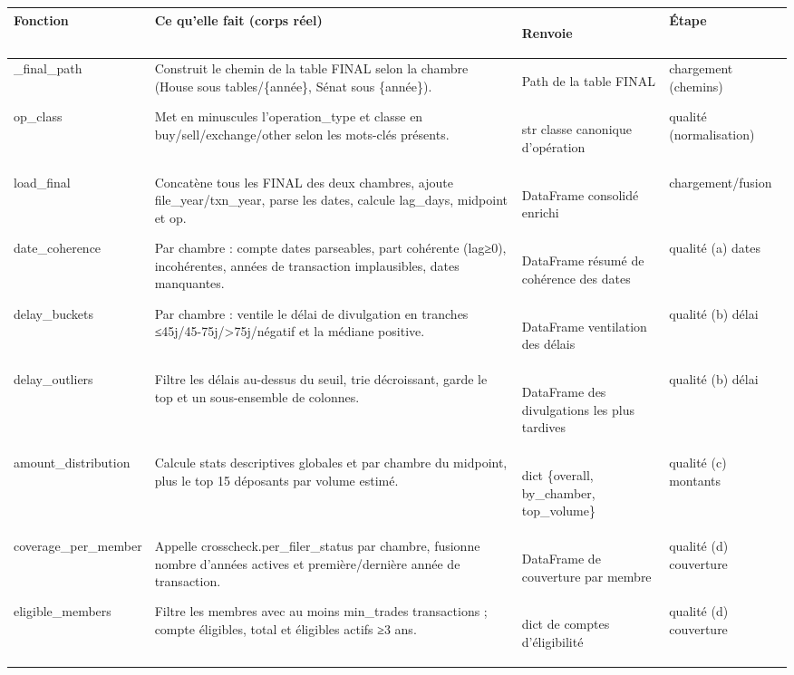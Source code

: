 \documentclass[11pt,a4paper]{article}
\makeatletter
\newenvironment{fnt}{%
  \par\footnotesize
  \setlength{\tabcolsep}{3pt}%
  \begin{longtable}{@{}>{\ttfamily\scriptsize\raggedright\arraybackslash}p{3.0cm} >{\raggedright\arraybackslash}p{7.5cm} >{\itshape\scriptsize\raggedright\arraybackslash}p{2.7cm} >{\scriptsize\raggedright\arraybackslash}p{1.85cm}@{}}
  \toprule
  \normalfont\bfseries\scriptsize Fonction & \bfseries\scriptsize Ce qu'elle fait (corps réel) &
  \normalfont\bfseries\scriptsize Renvoie & \normalfont\bfseries\scriptsize Étape\\
  \midrule\endhead
}{\bottomrule\end{longtable}\par}
\makeatother
\begin{document}
\begin{fnt}
_\allowbreak final_\allowbreak path & Construit le chemin de la table FINAL selon la chambre (House sous tables/\allowbreak{}\{année\},\allowbreak{} Sénat sous \{année\})\allowbreak{}. & Path de la table FINAL & chargement (chemins) \\
op_\allowbreak class & Met en minuscules l'operation_type et classe en buy/\allowbreak{}sell/\allowbreak{}exchange/\allowbreak{}other selon les mots-clés présents. & str classe canonique d'opération & qualité (normalisation) \\
load_\allowbreak final & Concatène tous les FINAL des deux chambres,\allowbreak{} ajoute file_year/\allowbreak{}txn_year,\allowbreak{} parse les dates,\allowbreak{} calcule lag_days,\allowbreak{} midpoint et op. & DataFrame consolidé enrichi & chargement/fusion \\
date_\allowbreak coherence & Par chambre : compte dates parseables,\allowbreak{} part cohérente (lag≥0)\allowbreak{},\allowbreak{} incohérentes,\allowbreak{} années de transaction implausibles,\allowbreak{} dates manquantes. & DataFrame résumé de cohérence des dates & qualité (a) dates \\
delay_\allowbreak buckets & Par chambre : ventile le délai de divulgation en tranches ≤45j/\allowbreak{}45-75j/\allowbreak{}>75j/\allowbreak{}négatif et la médiane positive. & DataFrame ventilation des délais & qualité (b) délai \\
delay_\allowbreak outliers & Filtre les délais au-dessus du seuil,\allowbreak{} trie décroissant,\allowbreak{} garde le top et un sous-ensemble de colonnes. & DataFrame des divulgations les plus tardives & qualité (b) délai \\
amount_\allowbreak distribution & Calcule stats descriptives globales et par chambre du midpoint,\allowbreak{} plus le top 15 déposants par volume estimé. & dict \{overall,\allowbreak{} by_chamber,\allowbreak{} top_volume\} & qualité (c) montants \\
coverage_\allowbreak per_\allowbreak member & Appelle crosscheck.per_filer_status par chambre,\allowbreak{} fusionne nombre d'années actives et première/\allowbreak{}dernière année de transaction. & DataFrame de couverture par membre & qualité (d) couverture \\
eligible_\allowbreak members & Filtre les membres avec au moins min_trades transactions ; compte éligibles,\allowbreak{} total et éligibles actifs ≥3 ans. & dict de comptes d'éligibilité & qualité (d) couverture \\

\end{fnt}
\end{document}
